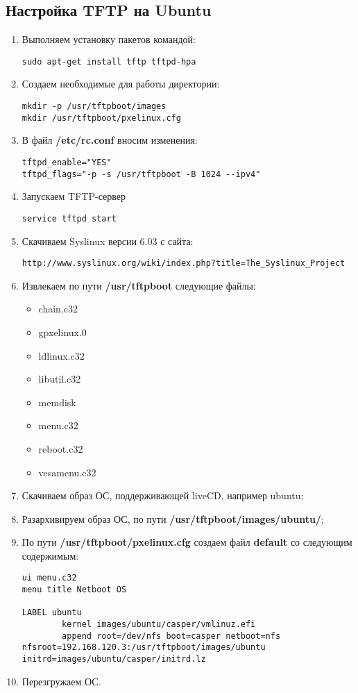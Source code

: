 \documentclass[14pt,a4paper,report]{report}
\begin{document}
\subsection{Настройка TFTP на Ubuntu}
\begin{enumerate}
\item Выполняем установку пакетов командой:
\begin{lstlisting}[language={}]
sudo apt-get install tftp tftpd-hpa
\end{lstlisting}
\item Создаем необходимые для работы директории:
\begin{lstlisting}[language={}]
mkdir -p /usr/tftpboot/images
mkdir /usr/tftpboot/pxelinux.cfg
\end{lstlisting}
\item В файл \textbf{/etc/rc.conf} вносим изменения:
\begin{lstlisting}[language={}]
tftpd_enable="YES"
tftpd_flags="-p -s /usr/tftpboot -B 1024 --ipv4"
\end{lstlisting}
\item Запускаем TFTP-сервер
\begin{lstlisting}[language={}]
service tftpd start
\end{lstlisting}
\item Скачиваем Syslinux версии 6.03 с сайта:
\begin{lstlisting}[language={}]
http://www.syslinux.org/wiki/index.php?title=The_Syslinux_Project
\end{lstlisting}
\item Извлекаем по пути \textbf{/usr/tftpboot} следующие файлы:

\begin{itemize}
\item chain.c32
\item gpxelinux.0
\item ldlinux.c32
\item libutil.c32
\item memdisk
\item menu.c32
\item reboot.c32
\item vesamenu.c32
\end{itemize}

\item Скачиваем образ ОС, поддерживающей liveCD, например ubuntu;
\item Разархивируем образ ОС, по пути \textbf{/usr/tftpboot/images/ubuntu/};
\item По пути \textbf{/usr/tftpboot/pxelinux.cfg} создаем файл \textbf{default} со следующим содержимым:
\begin{lstlisting}[language={}]
ui menu.c32
menu title Netboot OS

LABEL ubuntu
        kernel images/ubuntu/casper/vmlinuz.efi
        append root=/dev/nfs boot=casper netboot=nfs nfsroot=192.168.120.3:/usr/tftpboot/images/ubuntu initrd=images/ubuntu/casper/initrd.lz 
\end{lstlisting}
\item Перезгружаем ОС.
\end{enumerate}
\end{document}
